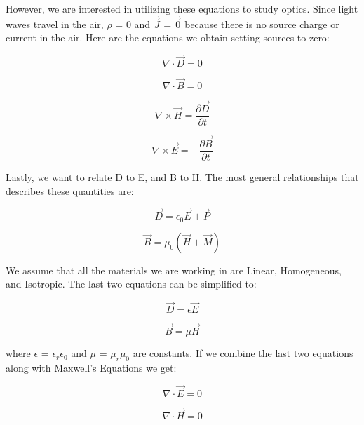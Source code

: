 \documentclass{article}
\begin{document}
However, we are interested in utilizing these equations to study optics. Since light waves travel in the air, \(\rho\) = 0 and \(\vec{J}\) = \(\vec{0}\) because there is no source charge or current in the air. Here are the equations we obtain setting sources to zero:

\begin{equation}
	\nabla \cdot \vec{D} = 0
\end{equation}

\begin{equation}
	\nabla \cdot \vec{B} = 0
\end{equation}

\begin{equation}
	\nabla \times \vec{H} = \frac{\partial \vec{D}}{\partial t}
\end{equation}

\begin{equation}
	\nabla \times \vec{E} = -\frac{\partial \vec{B}}{\partial t}
\end{equation}

Lastly, we want to relate D to E, and B to H. The most general relationships that describes these quantities are:

\begin{equation}
	\vec{D} = \epsilon_{0}\vec{E} + \vec{P}
\end{equation}

\begin{equation}
	\vec{B} = \mu_{0}(\vec{H} + \vec{M})
\end{equation}

We assume that all the materials we are working in are Linear, Homogeneous, and Isotropic. The last two equations can be simplified to:

\begin{equation}
	\vec{D} = \epsilon\vec{E}
\end{equation}

\begin{equation}
	\vec{B} = \mu\vec{H}
\end{equation}

where \(\epsilon\) = \(\epsilon_{r}\)\(\epsilon_{0}\) and \(\mu\) = \(\mu_{r}\)\(\mu_{0}\) are constants. If we combine the last two equations along with Maxwell's Equations we get:

\begin{equation}
	\nabla \cdot \vec{E} = 0
\end{equation}

\begin{equation}
	\nabla \cdot \vec{H} = 0
\end{equation}
\end{document}
